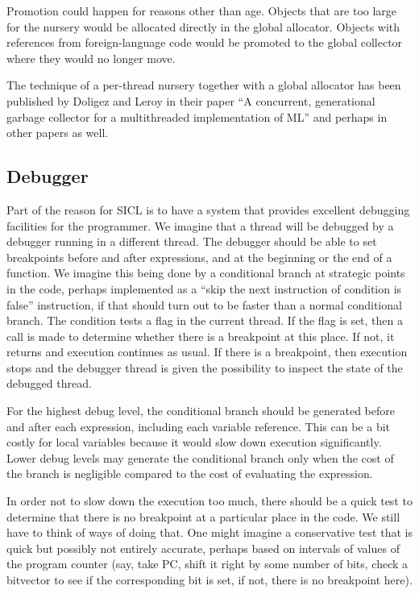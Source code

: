 \documentclass{article}
\begin{document}
Promotion could happen for reasons other than age.  Objects that are
too large for the nursery would be allocated directly in the global
allocator.  Objects with references from foreign-language code would
be promoted to the global collector where they would no longer move.

The technique of a per-thread nursery together with a global allocator
has been published by Doligez and Leroy in their paper ``A concurrent,
generational garbage collector for a multithreaded implementation of
ML'' and perhaps in other papers as well.

\subsection{Debugger}
\label{section-debugging}

Part of the reason for SICL is to have a system that provides
excellent debugging facilities for the programmer.  We imagine that a
thread will be debugged by a debugger running in a different thread.
The debugger should be able to set breakpoints before and after
expressions, and at the beginning or the end of a function.  
We imagine this being done by a conditional branch at strategic points
in the code, perhaps implemented as a ``skip the next instruction of
condition is false'' instruction, if that should turn out to be faster
than a normal conditional branch.  The condition tests a flag in the
current thread.  If the flag is set, then a call is made to determine
whether there is a breakpoint at this place.  If not, it returns and
execution continues as usual.  If there is a breakpoint, then
execution stops and the debugger thread is given the possibility to
inspect the state of the debugged thread. 

For the highest debug level, the conditional branch should be
generated before and after each expression, including each variable
reference.  This can be a bit costly for local variables because it
would slow down execution significantly.  Lower debug levels may
generate the conditional branch only when the cost of the branch is
negligible compared to the cost of evaluating the expression. 

In order not to slow down the execution too much, there should be a
quick test to determine that there is no breakpoint at a particular
place in the code.  We still have to think of ways of doing that.  One
might imagine a conservative test that is quick but possibly not
entirely accurate, perhaps based on intervals of values of the program
counter (say, take PC, shift it right by some number of bits, check a
bitvector to see if the corresponding bit is set, if not, there is no
breakpoint here). 
\end{document}
